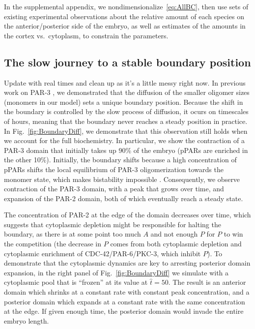 \documentclass[11pt]{article}
\newcommand{\red}[1]{\color{red}#1\normalcolor}
\newcommand{\6}[1]{#1_{\text{6}}}
\newcommand{\3}[1]{#1_{\text{3}}}
\begin{document}
In the supplemental appendix, we nondimensionalize\ \eqref{eq:AllBC}, then use sets of existing experimental observations about the relative amount of each species on the anterior/posterior side of the embryo, as well as estimates of the amounts in the cortex vs.\ cytoplasm, to constrain the parameters. 

\subsection{The slow journey to a stable boundary position}
\red{Update with real times and clean up as it's a little messy right now.} In previous work on PAR-3 \cite{lang2023oligomerization}, we demonstrated that the diffusion of the smaller oligomer sizes (monomers in our model) sets a unique boundary position. Because the shift in the boundary is controlled by the slow process of diffusion, it ocurs on timescales of hours, meaning that the boundary never reaches a steady position in practice. In Fig.\ \ref{fig:BoundaryDiff}, we demonstrate that this observation still holds when we account for the full biochemistry. In particular, we show the contraction of a PAR-3 domain that initially takes up 90\% of the embryo (pPARs are enriched in the other 10\%). Initially, the boundary shifts because a high concentration of pPARs shifts the local equilibrium of PAR-3 oligomerization towards the monomer state, which makes bistability impossible \cite{lang2023oligomerization}. Consequently, we observe contraction of the PAR-3 domain, with a peak that grows over time, and expansion of the PAR-2 domain, both of which eventually reach a steady state. 

The concentration of PAR-2 at the edge of the domain decreases over time, which suggests that cytoplasmic depletion might be responsible for halting the boundary, as there is at some point too much $A$ and not enough $P$ for $P$ to win the competition (the decrease in $P$ comes from both cytoplasmic depletion and cytoplasmic enrichment of CDC-42/PAR-6/PKC-3, which inhibit $P$). To demonstrate that the cytoplasmic dynamics are key to arresting posterior domain expansion, in the right panel of Fig.\ \ref{fig:BoundaryDiff} we simulate with a cytoplasmic pool that is ``frozen'' at its value at $\hat t = 50$. The result is an anterior domain which shrinks at a constant rate with constant peak concentration, and a posterior domain which expands at a constant rate with the same concentration at the edge. If given enough time, the posterior domain would invade the entire embryo length. 
\end{document}
